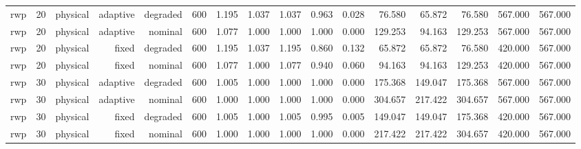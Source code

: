 \begin{tabular}{lrrrrrrrrrrrrrrr}
rwp & 20 & physical & adaptive & degraded & 600 & 1.195 & 1.037 & 1.037 & 0.963 & 0.028 & 76.580 & 65.872 & 76.580 & 567.000 & 567.000 \\
rwp & 20 & physical & adaptive & nominal & 600 & 1.077 & 1.000 & 1.000 & 1.000 & 0.000 & 129.253 & 94.163 & 129.253 & 567.000 & 567.000 \\
rwp & 20 & physical & fixed & degraded & 600 & 1.195 & 1.037 & 1.195 & 0.860 & 0.132 & 65.872 & 65.872 & 76.580 & 420.000 & 567.000 \\
rwp & 20 & physical & fixed & nominal & 600 & 1.077 & 1.000 & 1.077 & 0.940 & 0.060 & 94.163 & 94.163 & 129.253 & 420.000 & 567.000 \\
rwp & 30 & physical & adaptive & degraded & 600 & 1.005 & 1.000 & 1.000 & 1.000 & 0.000 & 175.368 & 149.047 & 175.368 & 567.000 & 567.000 \\
rwp & 30 & physical & adaptive & nominal & 600 & 1.000 & 1.000 & 1.000 & 1.000 & 0.000 & 304.657 & 217.422 & 304.657 & 567.000 & 567.000 \\
rwp & 30 & physical & fixed & degraded & 600 & 1.005 & 1.000 & 1.005 & 0.995 & 0.005 & 149.047 & 149.047 & 175.368 & 420.000 & 567.000 \\
rwp & 30 & physical & fixed & nominal & 600 & 1.000 & 1.000 & 1.000 & 1.000 & 0.000 & 217.422 & 217.422 & 304.657 & 420.000 & 567.000 \\
\bottomrule
\end{tabular}
